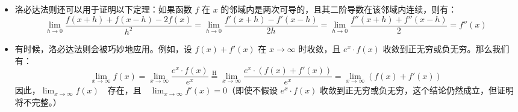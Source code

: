 \begin{itemize}
$$$$
\item 洛必达法则还可以用于证明以下定理：如果函数 $f$ 在 $x$ 的邻域内是两次可导的，且其二阶导数在该邻域内连续，则有：
$$
\lim_{h \to 0} \frac{f(x+h) + f(x-h) - 2f(x)}{h^2}
= \lim_{h \to 0} \frac{f'(x+h) - f'(x-h)}{2h}
= \lim_{h \to 0} \frac{f''(x+h) + f''(x-h)}{2}
= f''(x)~
$$
\item 有时候，洛必达法则会被巧妙地应用。例如，设 $f(x) + f'(x)$ 在 $x \to \infty$ 时收敛，且 $e^x \cdot f(x)$ 收敛到正无穷或负无穷。那么我们有：
$$
\lim_{x \to \infty} f(x)
= \lim_{x \to \infty} \frac{e^x \cdot f(x)}{e^x}
\stackrel{\mathrm{H}}{=}
\lim_{x \to \infty} \frac{e^x \cdot (f(x) + f'(x))}{e^x}
= \lim_{x \to \infty} (f(x) + f'(x))~
$$
因此，$\lim_{x \to \infty} f(x) \quad \text{存在，且} \quad \lim_{x \to \infty} f'(x) = 0$（即使不假设 $e^x \cdot f(x)$ 收敛到正无穷或负无穷，这个结论仍然成立，但证明将不完整。）

\end{itemize}


